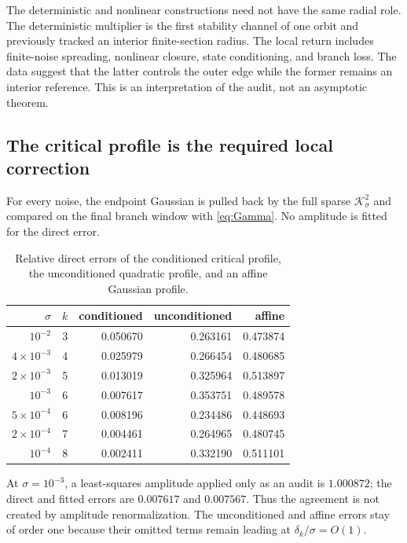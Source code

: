 \documentclass[11pt]{article}
\theoremstyle{definition}
\theoremstyle{remark}
\newcommand{\cK}{\mathcal K}
\begin{document}
The deterministic and nonlinear constructions need not have the same radial
role.  The deterministic multiplier is the first stability channel of one
orbit and previously tracked an interior finite-section radius.  The local
return includes finite-noise spreading, nonlinear closure, state
conditioning, and branch loss.  The data suggest that the latter controls
the outer edge while the former remains an interior reference.  This is an
interpretation of the audit, not an asymptotic theorem.

\subsection{The critical profile is the required local correction}

For every noise, the endpoint Gaussian is pulled back by the full sparse
$\cK_\sigma^2$ and compared on the final branch window with
\eqref{eq:Gamma}.  No amplitude is fitted for the direct error.

\begin{table}[H]
\centering
\small
\caption{Relative direct errors of the conditioned critical profile, the
unconditioned quadratic profile, and an affine Gaussian profile.}
\label{tab:critical-errors}
\begin{tabular}{rrrrr}
\toprule
$\sigma$ & $k$ & conditioned & unconditioned & affine\\
\midrule
$10^{-2}$        &3&0.050670&0.263161&0.473874\\
$4\times10^{-3}$ &4&0.025979&0.266454&0.480685\\
$2\times10^{-3}$ &5&0.013019&0.325964&0.513897\\
$10^{-3}$        &6&0.007617&0.353751&0.489578\\
$5\times10^{-4}$ &6&0.008196&0.234486&0.448693\\
$2\times10^{-4}$ &7&0.004461&0.264965&0.480745\\
$10^{-4}$        &8&0.002411&0.332190&0.511101\\
\bottomrule
\end{tabular}
\end{table}

At $\sigma=10^{-3}$, a least-squares amplitude applied only as an audit is
$1.000872$; the direct and fitted errors are $0.007617$ and $0.007567$.
Thus the agreement is not created by amplitude renormalization.  The
unconditioned and affine errors stay of order one because their omitted
terms remain leading at $\delta_k/\sigma=O(1)$.
\end{document}

